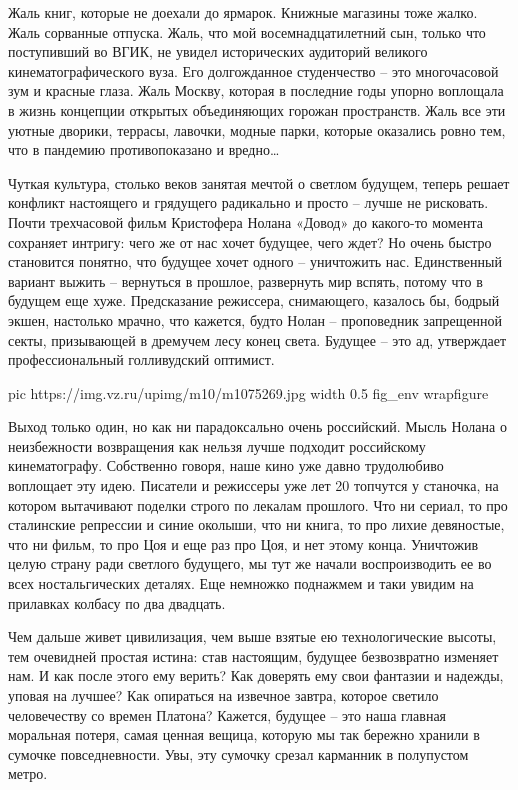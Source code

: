 Жаль книг, которые не доехали до ярмарок. Книжные магазины тоже жалко. Жаль
сорванные отпуска. Жаль, что мой восемнадцатилетний сын, только что поступивший
во ВГИК, не увидел исторических аудиторий великого кинематографического вуза.
Его долгожданное студенчество – это многочасовой зум и красные глаза. Жаль
Москву, которая в последние годы упорно воплощала в жизнь концепции открытых
объединяющих горожан пространств. Жаль все эти уютные дворики, террасы,
лавочки, модные парки, которые оказались ровно тем, что в пандемию
противопоказано и вредно…

Чуткая культура, столько веков занятая мечтой о светлом будущем, теперь решает
конфликт настоящего и грядущего радикально и просто – лучше не рисковать. Почти
трехчасовой фильм Кристофера Нолана «Довод» до какого-то момента сохраняет
интригу: чего же от нас хочет будущее, чего ждет? Но очень быстро становится
понятно, что будущее хочет одного – уничтожить нас. Единственный вариант выжить
– вернуться в прошлое, развернуть мир вспять, потому что в будущем еще хуже.
Предсказание режиссера, снимающего, казалось бы, бодрый экшен, настолько
мрачно, что кажется, будто Нолан – проповедник запрещенной секты, призывающей в
дремучем лесу конец света. Будущее – это ад, утверждает профессиональный
голливудский оптимист. 

\ifcmt
  pic https://img.vz.ru/upimg/m10/m1075269.jpg
  width 0.5
  fig_env wrapfigure
\fi

Выход только один, но как ни парадоксально очень российский. Мысль Нолана о
неизбежности возвращения как нельзя лучше подходит российскому кинематографу.
Собственно говоря, наше кино уже давно трудолюбиво воплощает эту идею. Писатели
и режиссеры уже лет 20 топчутся у станочка, на котором вытачивают поделки
строго по лекалам прошлого. Что ни сериал, то про сталинские репрессии и синие
околыши, что ни книга, то про лихие девяностые, что ни фильм, то про Цоя и еще
раз про Цоя, и нет этому конца. Уничтожив целую страну ради светлого будущего,
мы тут же начали воспроизводить ее во всех ностальгических деталях. Еще
немножко поднажмем и таки увидим на прилавках колбасу по два двадцать. 


Чем дальше живет цивилизация, чем выше взятые ею технологические высоты, тем
очевидней простая истина: став настоящим, будущее безвозвратно изменяет нам. И
как после этого ему верить? Как доверять ему свои фантазии и надежды, уповая на
лучшее? Как опираться на извечное завтра, которое светило человечеству со
времен Платона? Кажется, будущее – это наша главная моральная потеря, самая
ценная вещица, которую мы так бережно хранили в сумочке повседневности. Увы,
эту сумочку срезал карманник в полупустом метро.

